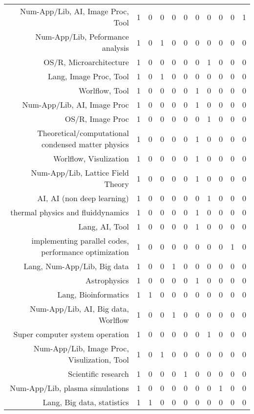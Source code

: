 {\begin{landscape}
\begin{longtable}[htb]{r|c|c|c|c|c|c|c|c|c|c}
{Num-App/Lib, AI, Image Proc, Tool} & 1 & 0 & 0 & 0 & 0 & 0 & 0 & 0 & 0 & 1 \\%
{Num-App/Lib, Peformance analysis} & 1 & 0 & 1 & 0 & 0 & 0 & 0 & 0 & 0 & 0 \\%
{OS/R, Microarchitecture} & 1 & 0 & 0 & 0 & 0 & 0 & 1 & 0 & 0 & 0 \\%
{Lang, Image Proc, Tool} & 1 & 0 & 1 & 0 & 0 & 0 & 0 & 0 & 0 & 0 \\%
{Worlflow, Tool} & 1 & 0 & 0 & 0 & 0 & 1 & 0 & 0 & 0 & 0 \\%
{Num-App/Lib, AI, Image Proc} & 1 & 0 & 0 & 0 & 0 & 1 & 0 & 0 & 0 & 0 \\%
{OS/R, Image Proc} & 1 & 0 & 0 & 0 & 0 & 0 & 1 & 0 & 0 & 0 \\%
{Theoretical/computational condensed matter physics} & 1 & 0 & 0 & 0 & 0 & 1 & 0 & 0 & 0 & 0 \\%
{Worlflow, Visulization} & 1 & 0 & 0 & 0 & 0 & 1 & 0 & 0 & 0 & 0 \\%
{Num-App/Lib, Lattice Field Theory} & 1 & 0 & 0 & 0 & 0 & 1 & 0 & 0 & 0 & 0 \\%
{AI, AI (non deep learning)} & 1 & 0 & 0 & 0 & 0 & 0 & 1 & 0 & 0 & 0 \\%
{thermal physics and fluiddynamics} & 1 & 0 & 0 & 0 & 0 & 1 & 0 & 0 & 0 & 0 \\%
{Lang, AI, Tool} & 1 & 0 & 0 & 0 & 0 & 1 & 0 & 0 & 0 & 0 \\%
{implementing parallel codes, performance optimization} & 1 & 0 & 0 & 0 & 0 & 0 & 0 & 0 & 1 & 0 \\%
{Lang, Num-App/Lib, Big data} & 1 & 0 & 0 & 1 & 0 & 0 & 0 & 0 & 0 & 0 \\%
{Astrophysics} & 1 & 0 & 0 & 0 & 0 & 1 & 0 & 0 & 0 & 0 \\%
{Lang, Bioinformatics} & 1 & 1 & 0 & 0 & 0 & 0 & 0 & 0 & 0 & 0 \\%
{Num-App/Lib, AI, Big data, Worlflow} & 1 & 0 & 0 & 1 & 0 & 0 & 0 & 0 & 0 & 0 \\%
{Super computer system operation} & 1 & 0 & 0 & 0 & 0 & 0 & 1 & 0 & 0 & 0 \\%
{Num-App/Lib, Image Proc, Visulization, Tool} & 1 & 0 & 1 & 0 & 0 & 0 & 0 & 0 & 0 & 0 \\%
{Scientific research} & 1 & 0 & 0 & 0 & 1 & 0 & 0 & 0 & 0 & 0 \\%
{Num-App/Lib, plasma simulations} & 1 & 0 & 0 & 0 & 0 & 0 & 0 & 1 & 0 & 0 \\%
{Lang, Big data, statistics} & 1 & 1 & 0 & 0 & 0 & 0 & 0 & 0 & 0 & 0 \\%

\end{longtable}
\end{landscape}}
